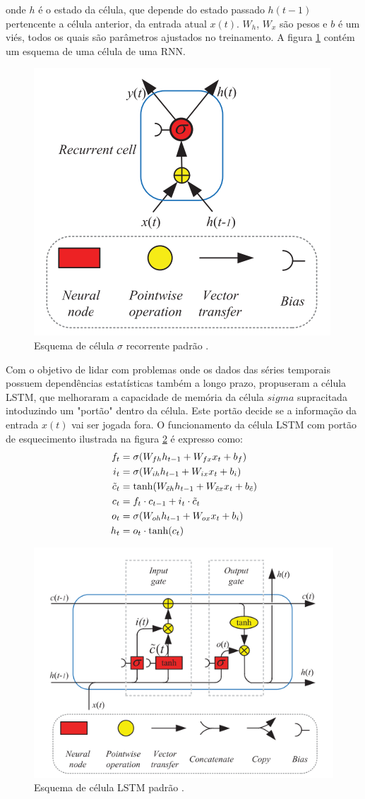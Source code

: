 onde $h$ é o estado da célula, que depende do estado passado $h(t-1)$ pertencente a célula anterior, da entrada atual $x(t)$. $W_h$, $W_x$ são pesos e $b$ é um viés, todos os quais são parâmetros ajustados no treinamento.  A figura \ref{fig:rnn_cell} contém um esquema de uma célula de uma RNN.

\begin{figure}[hbt!]
    \centering
    \includegraphics[width=0.5\linewidth]{Imagens/chap02/rnn_cell.png}
    \caption{Esquema de célula $\sigma$ recorrente padrão \cite{yu2019review}.}
    \label{fig:rnn_cell}
\end{figure}

Com o objetivo de lidar com problemas onde os dados das séries temporais possuem dependências estatísticas também a longo prazo, \cite{hochreiter1997long} propuseram a célula LSTM, que melhoraram a capacidade de memória da célula $sigma$ supracitada intoduzindo um "portão" dentro da célula. Este portão decide se a informação da entrada $x(t)$ vai ser jogada fora. O funcionamento da célula LSTM com portão de esquecimento ilustrada na figura \ref{fig:lstm_cell} é expresso como:
\begin{align}
    f_t &= \sigma(W_{fh}h_{t-1} + W_{fx}x_t + b_f) \\
    i_t &= \sigma(W_{ih}h_{t-1}+W_{ix}x_t+b_i) \\
    \Tilde{c}_t &= \tanh(W_{\Tilde{c}h}h_{t-1}+W_{\Tilde{c}x}x_t + b_{\Tilde{c}}) \\
    c_t &= f_t \cdot c_{t-1} + i_t \cdot \Tilde{c}_t \\   
    o_t &= \sigma(W_{oh}h_{t-1}+W_{ox}x_t+b_i) \\
    h_t &= o_t \cdot \tanh(c_t)
\end{align}

\begin{figure}[hbt!]
    \centering
    \includegraphics[width=0.6\linewidth]{Imagens/chap02/lstm_cell.png}
    \caption{Esquema de célula LSTM padrão \cite{yu2019review}.}
    \label{fig:lstm_cell}
\end{figure}

